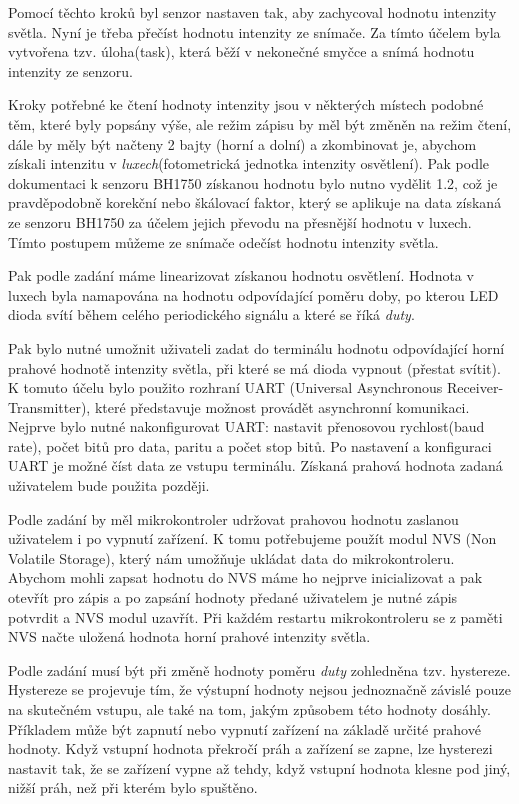 \documentclass[a4paper, 11pt]{article}
\begin{document}
Pomocí těchto kroků byl senzor nastaven tak, aby zachycoval hodnotu intenzity světla. Nyní je třeba přečíst hodnotu intenzity ze snímače.
Za tímto účelem byla vytvořena tzv. úloha(task), která běží v nekonečné smyčce a snímá hodnotu intenzity ze senzoru. 

Kroky potřebné ke čtení hodnoty intenzity jsou v některých místech podobné těm, které byly popsány výše, ale režim zápisu by měl být změněn na režim čtení, dále by měly být načteny 2 bajty (horní a dolní) a zkombinovat je, abychom získali intenzitu v \textit{luxech}(fotometrická jednotka intenzity osvětlení). Pak podle dokumentaci k senzoru BH1750 \cite{source4} získanou hodnotu bylo nutno vydělit 1.2, což je pravděpodobně korekční nebo škálovací faktor, který se aplikuje na data získaná ze senzoru BH1750 za účelem jejich převodu na přesnější hodnotu v luxech. 
Tímto postupem můžeme ze snímače odečíst hodnotu intenzity světla.

Pak podle zadání máme linearizovat získanou hodnotu osvětlení. Hodnota v luxech byla namapována na hodnotu odpovídající poměru doby, po kterou LED dioda svítí během celého periodického signálu a které se říká \textit{duty}.

Pak bylo nutné umožnit uživateli zadat do terminálu hodnotu odpovídající horní prahové hodnotě intenzity světla, při které se má dioda vypnout (přestat svítit).
K tomuto účelu bylo použito rozhraní UART (Universal Asynchronous Receiver-Transmitter), které představuje možnost provádět asynchronní komunikaci. Nejprve bylo nutné nakonfigurovat UART: nastavit přenosovou rychlost(baud rate), počet bitů pro data, paritu a počet stop bitů. Po nastavení a konfiguraci UART je možné číst data ze vstupu terminálu. Získaná prahová hodnota zadaná uživatelem bude použita později. 

Podle zadání by měl mikrokontroler udržovat prahovou hodnotu zaslanou uživatelem i po vypnutí zařízení. K tomu potřebujeme použít modul NVS (Non Volatile Storage), který nám umožňuje ukládat data do mikrokontroleru. Abychom mohli zapsat hodnotu do NVS máme ho nejprve inicializovat a pak otevřít pro zápis a po zapsání hodnoty předané uživatelem je nutné zápis potvrdit a NVS modul uzavřít. Při každém restartu mikrokontroleru se z paměti NVS načte uložená hodnota horní prahové intenzity světla.

Podle zadání musí být při změně hodnoty poměru \textit{duty} zohledněna tzv. hystereze. 
Hystereze se projevuje tím, že výstupní hodnoty nejsou jednoznačně závislé pouze na skutečném vstupu, ale také na tom, jakým způsobem této hodnoty dosáhly.
Příkladem může být zapnutí nebo vypnutí zařízení na základě určité prahové hodnoty. Když vstupní hodnota překročí práh a zařízení se zapne, lze hysterezi nastavit tak, že se zařízení vypne až tehdy, když vstupní hodnota klesne pod jiný, nižší práh, než při kterém bylo spuštěno.
\end{document}
